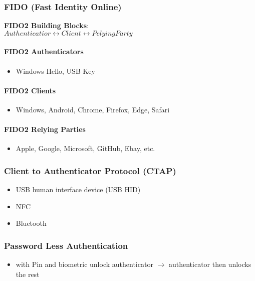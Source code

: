 \subsubsection{FIDO (Fast Identity Online)}
\textbf{FIDO2 Building Blocks}:\\
$Authenticatior \leftrightarrow Client \leftrightarrow Pelying Party$

\paragraph{FIDO2 Authenticators}
\begin{itemize}
    \item Windows Hello, USB Key
\end{itemize}

\paragraph{FIDO2 Clients}
\begin{itemize}
    \item Windows, Android, Chrome, Firefox, Edge, Safari
\end{itemize}

\paragraph{FIDO2 Relying Parties}
\begin{itemize}
    \item Apple, Google, Microsoft, GitHub, Ebay, etc.
\end{itemize}

\subsubsection{Client to Authenticator Protocol (CTAP)}
\begin{itemize}
    \item USB human interface device (USB HID)
    \item NFC
    \item Bluetooth
\end{itemize}

\subsubsection{Password Less Authentication}
\begin{itemize}
    \item with Pin and biometric unlock authenticator $\rightarrow$ authenticator then unlocks the rest
\end{itemize}

